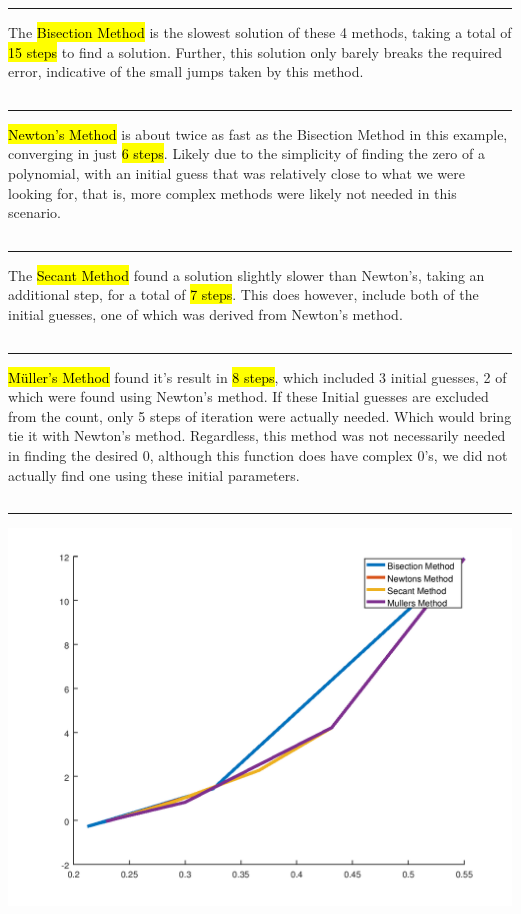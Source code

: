 \documentclass[10pt]{jhwhw}
\begin{document}
	\inputminted{octave}{p6.m}
	\bigbreak
	\textcolor[RGB]{240,240,240}{\rule{\textwidth}{0.5pt}}\bigbreak
	\bigbreak

	The \hl{Bisection Method} is the slowest solution of these 4 methods, taking 
	a total of \hl{15 steps} to find a solution. Further, this solution only barely
	breaks the required error, indicative of the small jumps taken by this method.
	\inputminted{text}{p6.bisection}
	\textcolor[RGB]{240,240,240}{\rule{\textwidth}{0.5pt}}\bigbreak
	
	\hl{Newton's Method} is about twice as fast as the Bisection Method in this example,
	converging in just \hl{6 steps}. Likely due to the simplicity of finding the zero
	of a polynomial, with an initial guess that was relatively close to what we were looking
	for, that is, more complex methods were likely not needed in this scenario.
	\inputminted{text}{p6.newtons}

	\textcolor[RGB]{240,240,240}{\rule{\textwidth}{0.5pt}}\bigbreak
	The \hl{Secant Method} found a solution slightly slower than Newton's, taking
	an additional step, for a total of \hl{7 steps}. This does however, include 
	both of the initial guesses, one of which was derived from Newton's method.
	\inputminted{text}{p6.secant}
	\textcolor[RGB]{240,240,240}{\rule{\textwidth}{0.5pt}}\bigbreak

	\clearpage
	\hl{M\"uller's Method} found it's result in \hl{8 steps}, which included 3 initial
	guesses, 2 of which were found using Newton's method. If these Initial guesses are 
	excluded from the count, only 5 steps of iteration were actually needed. Which
	would bring tie it with Newton's method. Regardless, this method was not necessarily
	needed in finding the desired 0, although this function does have complex 0's,
	we did not actually find one using these initial parameters.
	\inputminted{text}{p6.muller}
	\textcolor[RGB]{240,240,240}{\rule{\textwidth}{0.5pt}}\bigbreak

	\begin{center}
		\includegraphics[scale=0.75]{p6.png}
	\end{center}
\end{document}
